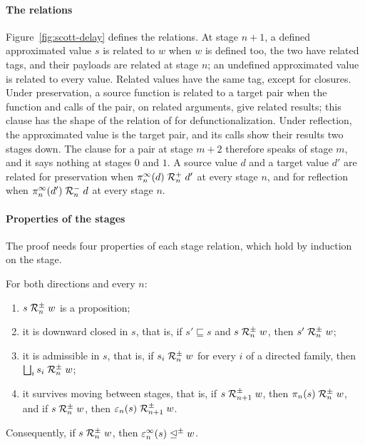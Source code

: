 \paragraph{The relations}

Figure~\ref{fig:scott-delay} defines the relations. At stage $n + 1$,
a defined approximated value $s$ is related to $w$ when $w$ is defined
too, the two have related tags, and their payloads are related at
stage $n$; an undefined approximated value is related to every value.
Related values have the same tag, except for closures. Under
preservation, a source function is related to a target pair when the
function and calls of the pair, on related arguments, give related
results; this clause has the shape of the relation of
\citet{Nielsen:2000aa} for defunctionalization. Under reflection, the
approximated value is the target pair, and its calls show their
results two stages down. The clause for a pair at stage $m + 2$
therefore speaks of stage $m$, and it says nothing at stages $0$ and
$1$. A source value $d$ and a target value $d'$ are related for
preservation when $\pi^\infty_n(d) \mathrel{\mathcal{R}^{+}_{n}} d'$ at every stage $n$, and
for reflection when $\pi^\infty_n(d') \mathrel{\mathcal{R}^{-}_{n}} d$ at every stage $n$.

\paragraph{Properties of the stages}

The proof needs four properties of each stage relation, which hold by
induction on the stage.

\begin{lemma}[Stages]\label{lem:scott-stages}
For both directions and every $n$:
\begin{enumerate}
\item $s \mathrel{\mathcal{R}^{\pm}_{n}} w$ is a proposition;
\item it is downward closed in $s$, that is, if $s' \sqsubseteq s$ and
  $s \mathrel{\mathcal{R}^{\pm}_{n}} w$, then $s' \mathrel{\mathcal{R}^{\pm}_{n}} w$;
\item it is admissible in $s$, that is, if $s_i \mathrel{\mathcal{R}^{\pm}_{n}} w$ for every $i$
  of a directed family, then $\bigsqcup_i s_i \mathrel{\mathcal{R}^{\pm}_{n}} w$;
\item it survives moving between stages, that is, if $s \mathrel{\mathcal{R}^{\pm}_{n+1}} w$, then
  $\pi_n(s) \mathrel{\mathcal{R}^{\pm}_{n}} w$, and if $s \mathrel{\mathcal{R}^{\pm}_{n}} w$, then
  $\varepsilon_n(s) \mathrel{\mathcal{R}^{\pm}_{n+1}} w$.
\end{enumerate}
Consequently, if $s \mathrel{\mathcal{R}^{\pm}_{n}} w$, then
$\varepsilon^\infty_n(s) \mathrel{\trianglelefteq^{\pm}} w$.
\end{lemma}

